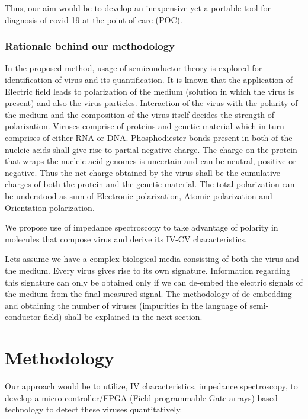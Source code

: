 \documentclass{FR16}
\begin{document}
Thus, our aim would be to develop an inexpensive yet a portable tool for diagnosis of covid-19 at the point of care (POC).


\subsubsection{Rationale behind our methodology}
In the proposed method, usage of semiconductor theory is explored for identification of virus and its quantification. It is known that the application of Electric field leads to polarization of the medium (solution in which the virus is present) and also the virus particles. Interaction of the virus with the polarity of the medium and the composition of the virus itself decides the strength of polarization. Viruses comprise of proteins and genetic material which in-turn comprises of either RNA or DNA. Phosphodiester bonds present in both of the nucleic acids shall give rise to partial negative charge. The charge on the protein that wraps the nucleic acid genomes is uncertain and can be neutral, positive or negative. Thus the net charge obtained by the virus shall be the cumulative charges of both the protein and the genetic material. The total polarization  can be understood as sum of Electronic polarization, Atomic polarization and Orientation polarization.

We propose use of impedance spectroscopy to take advantage of polarity in molecules that compose virus and derive its IV-CV characteristics.


Lets assume we have a complex biological media consisting of both the virus and the medium. Every virus gives rise to its own signature. Information regarding this signature can only be obtained only if we can de-embed  the electric signals of the medium from the final measured signal. The methodology of de-embedding and obtaining the number of viruses (impurities in the language of semi-conductor field) shall be explained in  the next section.





\newpage
\section{Methodology}
Our approach would be to utilize, IV  characteristics, impedance spectroscopy, %
to develop a micro-controller/FPGA (Field programmable Gate arrays) based technology to detect these viruses quantitatively.
\end{document}
